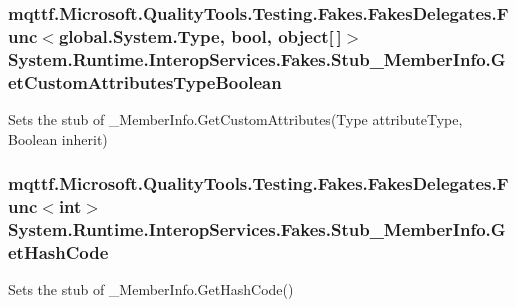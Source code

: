 \hypertarget{class_system_1_1_runtime_1_1_interop_services_1_1_fakes_1_1_stub___member_info_a41f1b25685f7dd26b7e88b9b7798b833}{
\subsubsection[{Get\-Custom\-Attributes\-Type\-Boolean}]{\setlength{\rightskip}{0pt plus 5cm}mqttf.\-Microsoft.\-Quality\-Tools.\-Testing.\-Fakes.\-Fakes\-Delegates.\-Func$<$global.\-System.\-Type, bool, object\mbox{[}$\,$\mbox{]}$>$ System.\-Runtime.\-Interop\-Services.\-Fakes.\-Stub\-\_\-\-Member\-Info.\-Get\-Custom\-Attributes\-Type\-Boolean}}\label{class_system_1_1_runtime_1_1_interop_services_1_1_fakes_1_1_stub___member_info_a41f1b25685f7dd26b7e88b9b7798b833}


Sets the stub of \-\_\-\-Member\-Info.\-Get\-Custom\-Attributes(\-Type attribute\-Type, Boolean inherit)

\hypertarget{class_system_1_1_runtime_1_1_interop_services_1_1_fakes_1_1_stub___member_info_a898a56617d1f6c58561e06725d7dfcb2}{
\subsubsection[{Get\-Hash\-Code}]{\setlength{\rightskip}{0pt plus 5cm}mqttf.\-Microsoft.\-Quality\-Tools.\-Testing.\-Fakes.\-Fakes\-Delegates.\-Func$<$int$>$ System.\-Runtime.\-Interop\-Services.\-Fakes.\-Stub\-\_\-\-Member\-Info.\-Get\-Hash\-Code}}\label{class_system_1_1_runtime_1_1_interop_services_1_1_fakes_1_1_stub___member_info_a898a56617d1f6c58561e06725d7dfcb2}


Sets the stub of \-\_\-\-Member\-Info.\-Get\-Hash\-Code()

